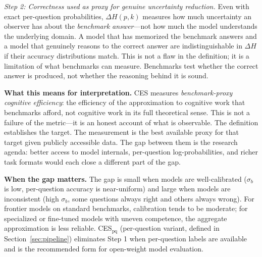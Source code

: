 \documentclass[12pt]{article}
\begin{document}
\textit{Step 2: Correctness used as proxy for genuine uncertainty reduction.} Even with exact per-question probabilities, $\Delta H(p, k)$ measures how much uncertainty an observer has about the \textit{benchmark answer}---not how much the model understands the underlying domain. A model that has memorized the benchmark answers and a model that genuinely reasons to the correct answer are indistinguishable in $\Delta H$ if their accuracy distributions match. This is not a flaw in the definition; it is a limitation of what benchmarks can measure. Benchmarks test whether the correct answer is produced, not whether the reasoning behind it is sound.

\textbf{What this means for interpretation.} CES measures \textit{benchmark-proxy cognitive efficiency}: the efficiency of the approximation to cognitive work that benchmarks afford, not cognitive work in its full theoretical sense. This is not a failure of the metric---it is an honest account of what is observable. The definition establishes the target. The measurement is the best available proxy for that target given publicly accessible data. The gap between them is the research agenda: better access to model internals, per-question log-probabilities, and richer task formats would each close a different part of the gap.

\textbf{When the gap matters.} The gap is small when models are well-calibrated ($\sigma_b$ is low, per-question accuracy is near-uniform) and large when models are inconsistent (high $\sigma_b$, some questions always right and others always wrong). For frontier models on standard benchmarks, calibration tends to be moderate; for specialized or fine-tuned models with uneven competence, the aggregate approximation is less reliable. CES$_{\text{pq}}$ (per-question variant, defined in Section~\ref{sec:pipeline}) eliminates Step 1 when per-question labels are available and is the recommended form for open-weight model evaluation.
\end{document}

